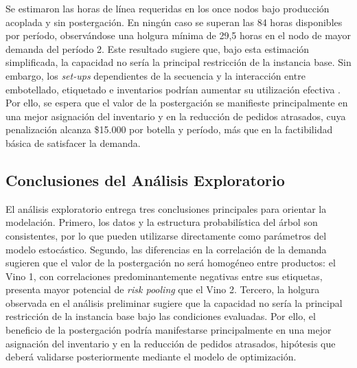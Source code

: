 Se estimaron las horas de línea requeridas en los once nodos bajo producción acoplada y sin postergación. En ningún caso se superan las 84 horas disponibles por período, observándose una holgura mínima de 29,5 horas en el nodo de mayor demanda del período 2. Este resultado sugiere que, bajo esta estimación simplificada, la capacidad no sería la principal restricción de la instancia base. Sin embargo, los
\textit{set-ups} dependientes de la secuencia y la interacción entre
embotellado, etiquetado e inventarios podrían aumentar su utilización efectiva \cite{maccawley2022}. Por ello, se espera que el valor de la postergación se manifieste principalmente en una mejor asignación del inventario y en la reducción de pedidos atrasados, cuya penalización alcanza \$15.000 por botella y período, más que en la factibilidad básica de satisfacer la demanda.
\subsection{Conclusiones del Análisis Exploratorio\label{sec:s6}}

El análisis exploratorio entrega tres conclusiones principales para orientar la modelación. Primero, los datos y la estructura probabilística del árbol son consistentes, por lo que pueden utilizarse directamente como parámetros del
modelo estocástico. Segundo, las diferencias en la correlación de la demanda sugieren que el valor de la postergación no será homogéneo entre productos: el Vino 1, con correlaciones predominantemente negativas entre sus etiquetas, presenta mayor potencial de \textit{risk pooling} que el Vino 2. Tercero, la holgura observada en el análisis preliminar sugiere que la capacidad no sería la principal restricción de la instancia base bajo las condiciones evaluadas. Por ello, el beneficio de la postergación podría manifestarse principalmente en una mejor asignación del inventario y en la reducción de pedidos atrasados, hipótesis que deberá validarse posteriormente mediante el modelo de optimización.
